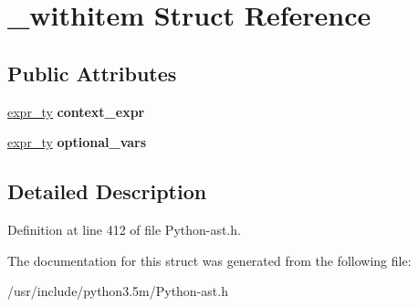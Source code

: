 \hypertarget{struct__withitem}{}\section{\+\_\+withitem Struct Reference}
\label{struct__withitem}
\subsection*{Public Attributes}
\begin{DoxyCompactItemize}
\item 
\hyperlink{struct__expr}{expr\+\_\+ty} {\bfseries context\+\_\+expr}\hypertarget{struct__withitem_afcfaefdf2f804c3cbe8e8cf3bd270b9e}{}\label{struct__withitem_afcfaefdf2f804c3cbe8e8cf3bd270b9e}

\item 
\hyperlink{struct__expr}{expr\+\_\+ty} {\bfseries optional\+\_\+vars}\hypertarget{struct__withitem_ac9cf1252b691115610ffd43a12ccccc3}{}\label{struct__withitem_ac9cf1252b691115610ffd43a12ccccc3}

\end{DoxyCompactItemize}


\subsection{Detailed Description}


Definition at line 412 of file Python-\/ast.\+h.



The documentation for this struct was generated from the following file\+:\begin{DoxyCompactItemize}
\item 
/usr/include/python3.\+5m/Python-\/ast.\+h\end{DoxyCompactItemize}
